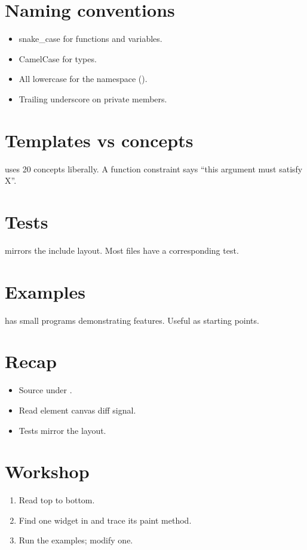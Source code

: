 \section{Naming conventions}

\begin{itemize}[leftmargin=*]
  \item snake\_case for functions and variables.
  \item CamelCase for types.
  \item All lowercase for the namespace ().
  \item Trailing underscore on private members.
\end{itemize}

\section{Templates vs concepts}

\maya{} uses \cpp{}20 concepts liberally. A function
constraint says ``this argument must satisfy X''.

\section{Tests}

 mirrors the include layout. Most files
have a corresponding test.

\section{Examples}

 has small programs demonstrating
features. Useful as starting points.

\section{Recap}

\begin{recap}
\begin{itemize}[leftmargin=*]
  \item Source under .
  \item Read element \textrightarrow{} canvas
    \textrightarrow{} diff \textrightarrow{} signal.
  \item Tests mirror the layout.
\end{itemize}
\end{recap}

\section*{Workshop}

\begin{enumerate}[leftmargin=*]
  \item Read  top to bottom.
  \item Find one widget in  and trace its
    paint method.
  \item Run the examples; modify one.
\end{enumerate}

